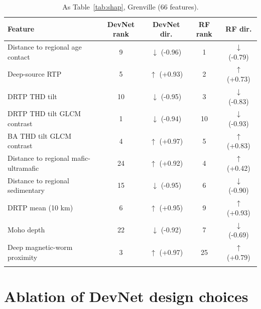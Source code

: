 \documentclass[pdflatex,sn-apa]{sn-jnl}
\begin{document}
\begin{appendices}
\begin{table}[!h]
\caption{As Table~\ref{tab:shap}, Grenville (66 features).}\label{tab:shap-gren}
\footnotesize
\begin{tabular*}{\textwidth}{@{\extracolsep\fill}lcccc}
\toprule
Feature & DevNet rank & DevNet dir. & RF rank & RF dir. \\
\midrule
Distance to regional age contact & 9 & $\downarrow$ (-0.96) & 1 & $\downarrow$ (-0.79) \\
Deep-source RTP & 5 & $\uparrow$ (+0.93) & 2 & $\uparrow$ (+0.73) \\
DRTP THD tilt & 10 & $\downarrow$ (-0.95) & 3 & $\downarrow$ (-0.83) \\
DRTP THD tilt GLCM contrast & 1 & $\downarrow$ (-0.94) & 10 & $\downarrow$ (-0.93) \\
BA THD tilt GLCM contrast & 4 & $\uparrow$ (+0.97) & 5 & $\uparrow$ (+0.83) \\
Distance to regional mafic-ultramafic & 24 & $\uparrow$ (+0.92) & 4 & $\uparrow$ (+0.42) \\
Distance to regional sedimentary & 15 & $\downarrow$ (-0.95) & 6 & $\downarrow$ (-0.90) \\
DRTP mean (10 km) & 6 & $\uparrow$ (+0.95) & 9 & $\uparrow$ (+0.93) \\
Moho depth & 22 & $\downarrow$ (-0.92) & 7 & $\downarrow$ (-0.69) \\
Deep magnetic-worm proximity & 3 & $\uparrow$ (+0.97) & 25 & $\uparrow$ (+0.79) \\
\botrule
\end{tabular*}
\end{table}

\clearpage
\section{Ablation of DevNet design choices}\label{app:sensitivity}


\end{appendices}
\end{document}
